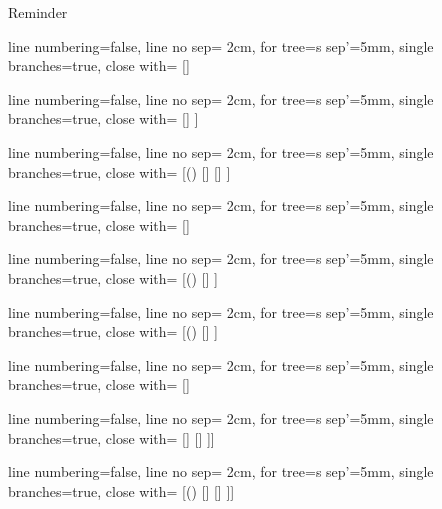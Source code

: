 \begin{frame}{Reminder}

		
			\begin{center}		
					\begin{prooftree}
					{
					line numbering=false,
					line no sep= 2cm,
					for tree={s sep'=5mm},
					single branches=true,
					close with=\xmark
					}
					[\neg\neg \phi [\phi ] ]
					\end{prooftree}
					\begin{prooftree}
					{
					line numbering=false,
					line no sep= 2cm,
					for tree={s sep'=5mm},
					single branches=true,
					close with=\xmark
					}
					[\phi\land\psi [\phi [\psi ] ] ]
					\end{prooftree}
					\begin{prooftree}
					{
					line numbering=false,
					line no sep= 2cm,
					for tree={s sep'=5mm},
					single branches=true,
					close with=\xmark
					}
					[\neg (\phi\land\psi) [\neg \phi ] [\neg \psi ] ]
					\end{prooftree}
					\begin{prooftree}
					{
					line numbering=false,
					line no sep= 2cm,
					for tree={s sep'=5mm},
					single branches=true,
					close with=\xmark
					}
					[\phi\lor\psi [\phi ] [\psi ] ]
					\end{prooftree}
					\begin{prooftree}
					{
					line numbering=false,
					line no sep= 2cm,
					for tree={s sep'=5mm},
					single branches=true,
					close with=\xmark
					}
					[\neg(\phi\lor\psi) [\neg\phi [\neg\psi ] ] ]
					\end{prooftree}

					\vspace{2ex}

					\begin{prooftree}
					{
					line numbering=false,
					line no sep= 2cm,
					for tree={s sep'=5mm},
					single branches=true,
					close with=\xmark
					}
					[\neg (\phi\to\psi) [\phi [\neg \psi ] ] ]
					\end{prooftree}
					\begin{prooftree}
					{
					line numbering=false,
					line no sep= 2cm,
					for tree={s sep'=5mm},
					single branches=true,
					close with=\xmark
					}
					[\phi\to\psi [\neg \phi ] [\psi ] ]
					\end{prooftree}
					\begin{prooftree}
					{
					line numbering=false,
					line no sep= 2cm,
					for tree={s sep'=5mm},
					single branches=true,
					close with=\xmark
					}
					[\phi\leftrightarrow \psi [\phi [\psi] ] [\neg \phi [\neg \psi] ] ]]
					\end{prooftree}
					\begin{prooftree}
					{
					line numbering=false,
					line no sep= 2cm,
					for tree={s sep'=5mm},
					single branches=true,
					close with=\xmark
					}
					[\neg(\phi\leftrightarrow \psi) [\phi [\neg \psi] ] [\neg \phi [ \psi] ] ]]
					\end{prooftree}


\end{center}
\end{frame}
